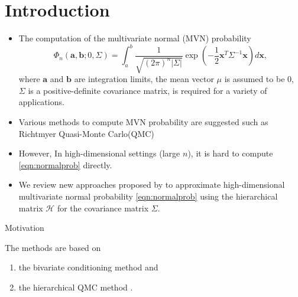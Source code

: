 \section{Introduction}

\begin{frame}{\secname}

    \begin{itemize}
        \item The computation of the multivariate normal (MVN) probability 
        \begin{equation}\label{eqn:normalprob}
            \Phi_n(\mathbf{a}, \mathbf{b}; 0, \Sigma) = \int_a^b \frac{1}{\sqrt{(2\pi)^n |\Sigma|}} \exp\left( -\frac{1}{2} \mathbf{x}^T \Sigma^{-1} \mathbf{x} \right) d\mathbf{x},
        \end{equation}
        where $\mathbf{a}$ and $\mathbf{b}$ are integration limits, the mean vector $\mu$ is assumed to be 0, $\Sigma$ is a positive-definite covariance matrix, is required for a variety of applications. 
        \item Various methods to compute MVN probability are suggested such as Richtmyer Quasi-Monte Carlo(QMC) \citep{genz2009computation}
        \item However, In high-dimensional settings (large $n$), it is hard to compute \eqref{eqn:normalprob} directly.
        \item We review new approaches proposed by \citet{cao2019hierarchical} to approximate high-dimensional multivariate normal probability \eqref{eqn:normalprob}
        using the hierarchical matrix $\mathcal{H}$ \citep{hackbusch2015hierarchical} for the covariance matrix $\Sigma$. 
    \end{itemize}
    
\end{frame}

\begin{frame}{Motivation}
    
    The methods are based on 
        \begin{enumerate}
            \item the bivariate conditioning method \citep{trinh2015bivariate} and
            \item the hierarchical QMC method \citep{genton2018hierarchical}.
        \end{enumerate} 
\end{frame}